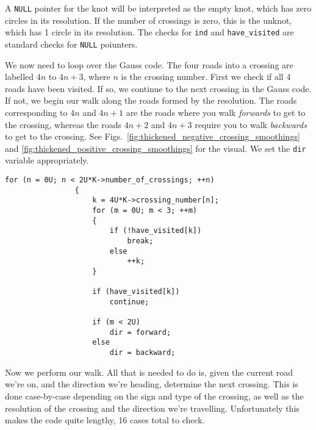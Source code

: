 \documentclass{article}
\theoremstyle{plain}
\begin{document}
        A \texttt{NULL} pointer for the knot will be interpreted as the empty
        knot, which has zero circles in its resolution. If the number of
        crossings is zero, this is the unknot, which has 1 circle in its
        resolution. The checks for \texttt{ind} and
        \texttt{have\_visited} are standard checks for \texttt{NULL} poiunters.
        \par\hfill\par
        We now need to loop over the Gauss code. The four roads into a crossing
        are labelled $4n$ to $4n+3$, where $n$ is the crossing number. First we
        check if all 4 roads have been visited. If so, we continue to the next
        crossing in the Gauss code. If not, we begin our walk along the roads
        formed by the resolution. The roads corresponding to
        $4n$ and $4n+1$ are the roads where you walk \textit{forwards} to
        get to the crossing, whereas the roads $4n+2$ and $4n+3$ require you to
        walk \textit{backwards} to get to the crossing.
        See Figs.~\ref{fig:thickened_negative_crossing_smoothings} and
        \ref{fig:thickened_positive_crossing_smoothings} for the visual.
        We set the \texttt{dir} variable appropriately.
        \begin{lstlisting}[style=CStyle, gobble=12]
                for (n = 0U; n < 2U*K->number_of_crossings; ++n)
                {
                    k = 4U*K->crossing_number[n];
                    for (m = 0U; m < 3; ++m)
                    {
                        if (!have_visited[k])
                            break;
                        else
                            ++k;
                    }

                    if (have_visited[k])
                        continue;

                    if (m < 2U)
                        dir = forward;
                    else
                        dir = backward;
        \end{lstlisting}
        Now we perform our walk. All that is needed to do is, given the
        current road we're on, and the direction we're heading, determine the
        next crossing. This is done case-by-case depending on the sign and
        type of the crossing, as well as the resolution of the crossing and the
        direction we're travelling. Unfortunately this makes the code quite
        lengthy, 16 cases total to check.
\end{document}
